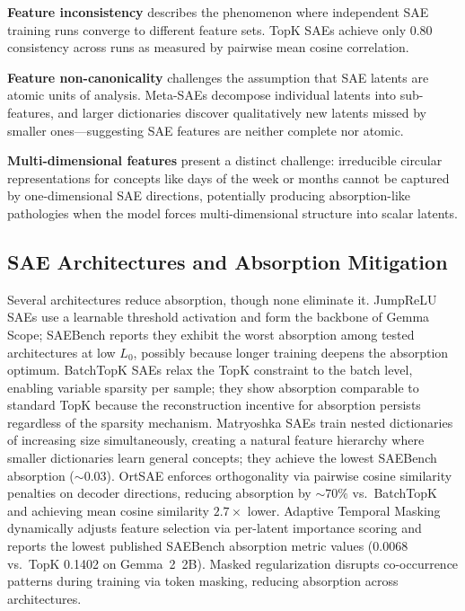 \documentclass{article}
\begin{document}
\textbf{Feature inconsistency} \citep{song2025inconsistency} describes the phenomenon where independent SAE training runs converge to different feature sets. TopK SAEs achieve only 0.80 consistency across runs as measured by pairwise mean cosine correlation.

\textbf{Feature non-canonicality} \citep{leask2025noncanonical} challenges the assumption that SAE latents are atomic units of analysis. Meta-SAEs decompose individual latents into sub-features, and larger dictionaries discover qualitatively new latents missed by smaller ones---suggesting SAE features are neither complete nor atomic.

\textbf{Multi-dimensional features} \citep{engels2024dark} present a distinct challenge: irreducible circular representations for concepts like days of the week or months cannot be captured by one-dimensional SAE directions, potentially producing absorption-like pathologies when the model forces multi-dimensional structure into scalar latents.

\subsection{SAE Architectures and Absorption Mitigation}

Several architectures reduce absorption, though none eliminate it. JumpReLU SAEs \citep{rajamanoharan2024jumprelu} use a learnable threshold activation and form the backbone of Gemma Scope; SAEBench reports they exhibit the worst absorption among tested architectures at low $L_0$, possibly because longer training deepens the absorption optimum. BatchTopK SAEs \citep{rajamanoharan2024batchtopk} relax the TopK constraint to the batch level, enabling variable sparsity per sample; they show absorption comparable to standard TopK because the reconstruction incentive for absorption persists regardless of the sparsity mechanism. Matryoshka SAEs \citep{bussmann2025matryoshka} train nested dictionaries of increasing size simultaneously, creating a natural feature hierarchy where smaller dictionaries learn general concepts; they achieve the lowest SAEBench absorption (${\sim}0.03$). OrtSAE \citep{korznikov2025ortsae} enforces orthogonality via pairwise cosine similarity penalties on decoder directions, reducing absorption by ${\sim}70\%$ vs.\ BatchTopK and achieving mean cosine similarity $2.7\times$ lower. Adaptive Temporal Masking \citep{li2025atm} dynamically adjusts feature selection via per-latent importance scoring and reports the lowest published SAEBench absorption metric values (0.0068 vs.\ TopK 0.1402 on Gemma~2~2B). Masked regularization \citep{narayanaswamy2026masked} disrupts co-occurrence patterns during training via token masking, reducing absorption across architectures.
\end{document}
